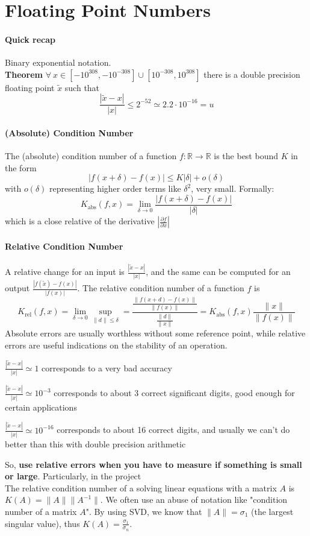 \documentclass[10pt]{report}
\begin{document}
\section{Floating Point Numbers}
\paragraph{Quick recap} Binary exponential notation.\\
\textbf{Theorem} $\forall\:x\in[-10^{308},-10^{-308}]\cup[10^{-308},10^{308}]$ there is a double precision floating point $\tilde{x}$ such that $$\frac{|\tilde{x} - x|}{|x|}\leq 2^{-52} \simeq 2.2\cdot10^{-16}=u$$
\paragraph{(Absolute) Condition Number} The (absolute) condition number of a function $f : \mathbb{R}\rightarrow\mathbb{R}$ is the best bound $K$ in the form $$|f(x+\delta)-f(x)|\leq K|\delta| + o(\delta)$$
with $o(\delta)$ representing higher order terms like $\delta^2$, very small. Formally: $$K_{\text{abs}}(f,x) = \lim_{\delta\to 0}\frac{|f(x+\delta)-f(x)|}{|\delta|}$$ which is a close relative of the derivative $|\frac{\partial f}{\partial x}|$
\paragraph{Relative Condition Number} A relative change for an input is $\frac{|\tilde{x}-x|}{|x|}$, and the same can be computed for an output $\frac{|f(\tilde{x})-f(x)|}{|f(x)|}$. The relative condition number of a function $f$ is $$K_{\text{rel}}(f,x) = \lim_{\delta\to0}\sup_{\|d\|\leq\delta} = \frac{\frac{\|f(x+d)-f(x)\|}{\|f(x)\|}}{\frac{\|d\|}{\|x\|}} = K_{\text{abs}}(f,x)\frac{\|x\|}{\|f(x)\|}$$
Absolute errors are usually worthless without some reference point, while relative errors are useful indications on the stability of an operation.
\begin{list}{}{}
	\item $\frac{|\tilde{x}-x|}{|x|}\simeq 1$ corresponds to a very bad accuracy
	\item $\frac{|\tilde{x}-x|}{|x|}\simeq 10^{-3}$ corresponds to about 3 correct significant digits, good enough for certain applications
	\item $\frac{|\tilde{x}-x|}{|x|}\simeq 10^{-16}$ corresponds to about 16 correct digits, and usually we can't do better than this with double precision arithmetic
\end{list}
So, \textbf{use relative errors when you have to measure if something is small or large}. Particularly, in the project\\
The relative condition number of a solving linear equations with a matrix $A$ is $K(A)=\|A\|\|A^{-1}\|$. We often use an abuse of notation like "condition number of a matrix $A$". By using SVD, we know that $\|A\|=\sigma_1$ (the largest singular value), thus $K(A)=\frac{\sigma_1}{\sigma_n}$.
\end{document}
